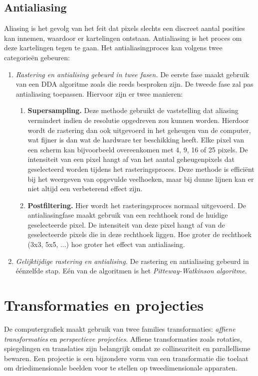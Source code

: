 \documentclass{report}
\begin{document}
	\section{Antialiasing}
	Aliasing is het gevolg van het feit dat pixels slechts een discreet aantal posities kan innemen, waardoor er kartelingen ontstaan. Antialiasing is het proces om deze kartelingen tegen te gaan. 
	Het antialiasingproces kan volgens twee categorieën gebeuren:
	\begin{enumerate}
		\item \textit{Rastering en antialising gebeurd in twee fasen.} De eerste fase maakt gebruik van een DDA algoritme zoals die reeds besproken zijn. De tweede fase zal pas antialiasing toepassen. Hiervoor zijn er twee manieren:
		\begin{enumerate}
			\item \textbf{Supersampling.} Deze methode gebruikt de vaststelling dat aliasing vermindert indien de resolutie opgedreven zou kunnen worden. Hierdoor wordt de rastering dan ook uitgevoerd in het geheugen van de computer, wat fijner is dan wat de hardware ter beschikking heeft. Elke pixel van een scherm kan bijvoorbeeld overeenkomen met 4, 9, 16 of 25 pixels. De intensiteit van een pixel hangt af van het aantal geheugenpixels dat geselecteerd worden tijdens het rasteringsproces. Deze methode is efficiënt bij het weergeven van opgevulde veelhoeken, maar bij dunne lijnen kan er niet altijd een verbeterend effect zijn.  
			\item \textbf{Postfiltering.} Hier wordt het rasteringsproces normaal uitgevoerd. De antialiasingfase maakt gebruik van een rechthoek rond de huidige geselecteerde pixel. De intensiteit van deze pixel hangt af van de geselecteerde pixels die in deze rechthoek liggen. Hoe groter de rechthoek (3x3, 5x5, ...) hoe groter het effect van antialiasing.
		\end{enumerate}
		\item \textit{Gelijktijdige rastering en antialising.} De rastering en antialiasing gebeurd in éénzelfde stap. Eén van de algoritmen is het \textit{Pitteway-Watkinson algoritme}. 
	\end{enumerate}
	\chapter{Transformaties en projecties}
	De computergrafiek maakt gebruik van twee families transformaties: \textit{affiene transformaties} en \textit{perspectieve projecties}. Affiene transformaties zoals rotaties, spiegelingen en translaties zijn belangrijk omdat ze collineariteit en parallellisme bewaren. Een projectie is een bijzondere vorm van een transformatie die toelaat om driedimensionale beelden voor te stellen op tweedimensionale apparaten.
\end{document}
